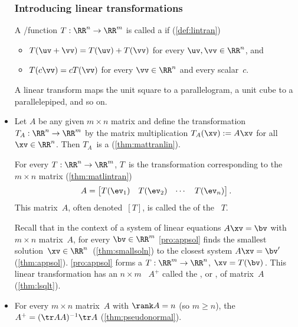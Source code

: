 \begin{itemize}
\subsubsection{Introducing linear transformations}

\itemme A \slash function \(T:\RR^n\to\RR^m\) is called a  if (\autoref{def:lintran})
\begin{itemize}
\item \(T(\uv+\vv)=T(\uv)+T(\vv)\) for every \(\uv,\vv\in\RR^n\), and
\item \(T(c\vv)=cT(\vv)\) for every \(\vv\in\RR^n\) and every scalar~\(c\).
\end{itemize}
A linear transform maps the unit square to a parallelogram, a unit cube to a parallelepiped, and so on.

\item Let \(A\) be any given \(m\times n\) matrix and define the transformation \(T_A:\RR^n\to\RR^m\)  by the matrix multiplication \(T_A(\xv):=A\xv\) for all \(\xv\in\RR^n\). 
Then \(T_A\)~is a  (\autoref{thm:mattranlin}). 

\itemme For every   \(T:\RR^n\to\RR^m\),
\(T\)~is the transformation corresponding to the \(m\times n\)  matrix (\autoref{thm:matlintran})
\begin{equation*}
A=\begin{bmatrix} T(\ev_1)& T(\ev_2)&\cdots&T(\ev_n) \end{bmatrix}.
\end{equation*}
This matrix~\(A\), often denoted~\([T]\), is called the  of the ~\(T\).

\itemme Recall that in the context of a system of linear equations \(A\xv=\bv\) with \(m\times n\) matrix~\(A\), for every \(\bv\in\RR^m\) \autoref{pro:appsol} finds the smallest solution~\(\xv\in\RR^n\)\ (\autoref{thm:smallsoln}) to the closest  system \(A\xv=\bv'\) (\autoref{thm:appsol}).
\autoref{pro:appsol} forms a  \(T:\RR^m\to\RR^n\), \(\xv=T(\bv)\)\,.
This linear transformation has an \(n\times m\) ~\(A^+\) called the , or , of matrix~\(A\) (\autoref{thm:lsqlt}).

\item For every \(m\times n\) matrix~\(A\) with \(\rank A=n\) (so \(m\geq n\)), the  \(A^+=(\tr AA)^{-1}\tr A\) (\autoref{thm:pseudonormal}).


\end{itemize}
